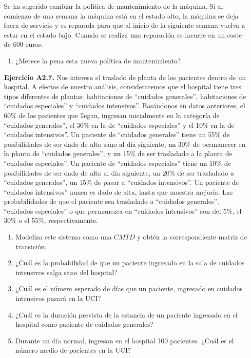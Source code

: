 \documentclass[
]{book}
\providecommand{\tightlist}{%
  \setlength{\itemsep}{0pt}\setlength{\parskip}{0pt}}
\theoremstyle{definition}
\theoremstyle{definition}
\theoremstyle{definition}
\theoremstyle{definition}
\theoremstyle{remark}
\begin{document}
Se ha sugerido cambiar la política de mantenimiento de la máquina. Si al comienzo de una semana la máquina está en el estado alto, la máquina se deja fuera de servicio y es reparada para que al inicio de la siguiente semana vuelva a estar en el estado bajo. Cuando se realiza una reparación se incurre en un coste de 600 euros.

\begin{enumerate}
\def\labelenumi{\arabic{enumi}.}
\setcounter{enumi}{5}
\tightlist
\item
  ¿Merece la pena esta nueva política de mantenimiento?
\end{enumerate}

\textbf{Ejercicio A2.7.} Nos interesa el traslado de planta de los pacientes dentro de un hospital. A efectos de nuestro análisis, consideraremos que el hospital tiene tres tipos diferentes de plantas: habitaciones de ``cuidados generales'', habitaciones de ``cuidados especiales'' y ``cuidados intensivos''. Basándonos en datos anteriores, el 60\% de los pacientes que llegan, ingresan inicialmente en la categoría de ``cuidados generales'', el 30\% en la de ``cuidados especiales'' y el 10\% en la de ``cuidados intensivos''. Un paciente de ``cuidados generales'' tiene un 55\% de posibilidades de ser dado de alta sano al día siguiente, un 30\% de permanecer en la planta de ``cuidados generales'', y un 15\% de ser trasladado a la planta de ``cuidados especiales''. Un paciente de ``cuidados especiales'' tiene un 10\% de posibilidades de ser dado de alta al día siguiente, un 20\% de ser trasladado a ``cuidados generales'', un 15\% de pasar a ``cuidados intensivos''. Un paciente de ``cuidados intensivos'' nunca es dado de alta, hasta que muestra mejoría. Las probabilidades de que el paciente sea trasladado a ``cuidados generales'', ``cuidados especiales'' o que permanezca en ``cuidados intensivos'' son del 5\%, el 30\% o el 55\%, respectivamente.

\begin{enumerate}
\def\labelenumi{\arabic{enumi}.}
\tightlist
\item
  Modeliza este sistema como una \(CMTD\) y obtén la correspondiente matriz de transición.
\item
  ¿Cuál es la probabilidad de que un paciente ingresado en la sala de cuidados intensivos salga sano del hospital?
\item
  ¿Cuál es el número esperado de días que un paciente, ingresado en cuidados intensivos pasará en la UCI?
\item
  ¿Cuál es la duración prevista de la estancia de un paciente ingresado en el hospital como paciente de cuidados generales?
\item
  Durante un día normal, ingresan en el hospital 100 pacientes. ¿Cuál es el número medio de pacientes en la UCI?
\end{enumerate}
\end{document}
